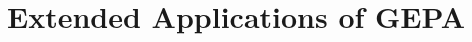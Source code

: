 \documentclass{article} %
\begin{document}



\section{Extended Applications of GEPA}\label{sec:extended_apps}
\end{document}
